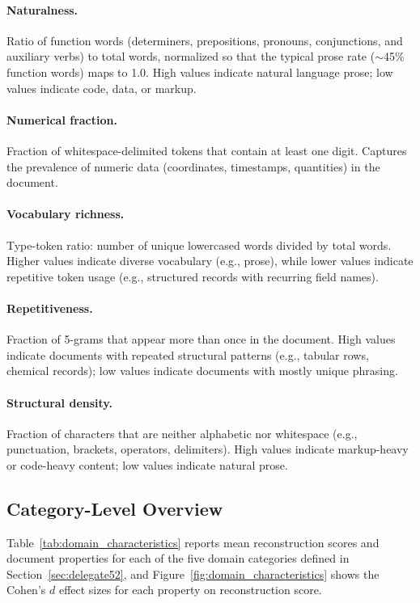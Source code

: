 \documentclass{article} %
\begin{document}
\paragraph{Naturalness.} Ratio of function words (determiners, prepositions, pronouns, conjunctions, and auxiliary verbs) to total words, normalized so that the typical prose rate (${\sim}$45\% function words) maps to 1.0. High values indicate natural language prose; low values indicate code, data, or markup.

\paragraph{Numerical fraction.} Fraction of whitespace-delimited tokens that contain at least one digit. Captures the prevalence of numeric data (coordinates, timestamps, quantities) in the document.

\paragraph{Vocabulary richness.} Type-token ratio: number of unique lowercased words divided by total words. Higher values indicate diverse vocabulary (e.g., prose), while lower values indicate repetitive token usage (e.g., structured records with recurring field names).

\paragraph{Repetitiveness.} Fraction of 5-grams that appear more than once in the document. High values indicate documents with repeated structural patterns (e.g., tabular rows, chemical records); low values indicate documents with mostly unique phrasing.

\paragraph{Structural density.} Fraction of characters that are neither alphabetic nor whitespace (e.g., punctuation, brackets, operators, delimiters). High values indicate markup-heavy or code-heavy content; low values indicate natural prose.

\subsection{Category-Level Overview}

Table~\ref{tab:domain_characteristics} reports mean reconstruction scores and document properties for each of the five domain categories defined in Section~\ref{sec:delegate52}, and Figure~\ref{fig:domain_characteristics} shows the Cohen's $d$ effect sizes for each property on reconstruction score.
\end{document}
